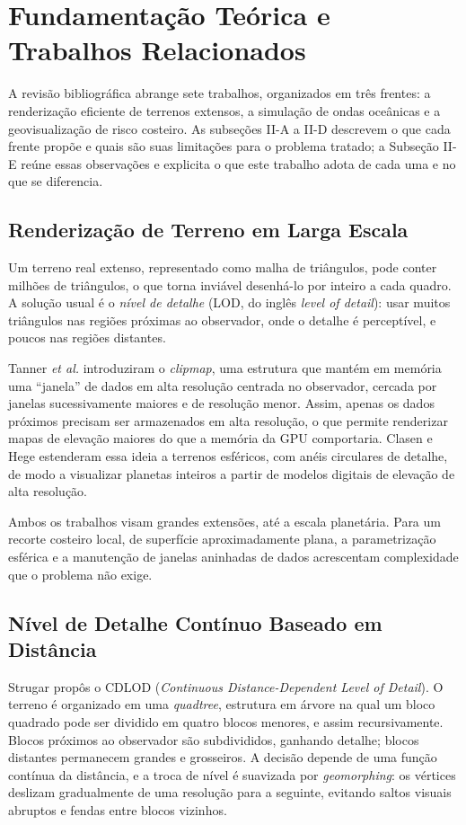 \documentclass[conference]{IEEEtran}
\begin{document}
\section{Fundamentação Teórica e Trabalhos Relacionados}

A revisão bibliográfica abrange sete trabalhos, organizados em três
frentes: a renderização eficiente de terrenos extensos, a simulação de
ondas oceânicas e a geovisualização de risco costeiro. As subseções
II-A a II-D descrevem o que cada frente propõe e quais são suas limitações
para o problema tratado; a Subseção II-E reúne essas observações e
explicita o que este trabalho adota de cada uma e no que se diferencia.

\subsection{Renderização de Terreno em Larga Escala}

Um terreno real extenso, representado como malha de triângulos, pode
conter milhões de triângulos, o que torna inviável desenhá-lo por inteiro
a cada quadro. A solução usual é o \emph{nível de detalhe} (LOD, do
inglês \emph{level of detail}): usar muitos triângulos nas regiões
próximas ao observador, onde o detalhe é perceptível, e poucos nas
regiões distantes.

Tanner \emph{et al.} \cite{tanner1998} introduziram o \emph{clipmap}, uma
estrutura que mantém em memória uma ``janela'' de dados em alta
resolução centrada no observador, cercada por janelas sucessivamente
maiores e de resolução menor. Assim, apenas os dados próximos precisam
ser armazenados em alta resolução, o que permite renderizar mapas de
elevação maiores do que a memória da GPU comportaria. Clasen e Hege
\cite{clasenhege2006} estenderam essa ideia a terrenos esféricos, com
anéis circulares de detalhe, de modo a visualizar planetas inteiros a
partir de modelos digitais de elevação de alta resolução.

Ambos os trabalhos visam grandes extensões, até a escala planetária. Para
um recorte costeiro local, de superfície aproximadamente plana, a
parametrização esférica e a manutenção de janelas aninhadas de dados
acrescentam complexidade que o problema não exige.

\subsection{Nível de Detalhe Contínuo Baseado em Distância}

Strugar \cite{strugar2009} propôs o CDLOD (\emph{Continuous
Distance-Dependent Level of Detail}). O terreno é organizado em uma
\emph{quadtree}, estrutura em árvore na qual um bloco quadrado pode ser
dividido em quatro blocos menores, e assim recursivamente. Blocos
próximos ao observador são subdivididos, ganhando detalhe; blocos
distantes permanecem grandes e grosseiros. A decisão depende de uma
função contínua da distância, e a troca de nível é suavizada por
\emph{geomorphing}: os vértices deslizam gradualmente de uma resolução
para a seguinte, evitando saltos visuais abruptos e fendas entre blocos
vizinhos.
\end{document}
